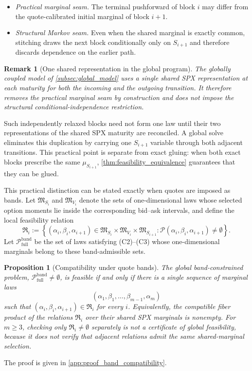 \documentclass{article}
\newtheorem{proposition}{Proposition}[section]
\newtheorem{remark}[theorem]{Remark}
\newcommand{\cP}{\mathcal{P}}
\begin{document}
\begin{itemize}
    \item \emph{Practical marginal seam.} The terminal pushforward of block $i$ may differ from the quote-calibrated initial marginal of block $i+1$.
    \item \emph{Structural Markov seam.} Even when the shared marginal is exactly common, stitching draws the next block conditionally only on $S_{i+1}$ and therefore discards dependence on the earlier path.
\end{itemize}

\begin{remark}[One shared representation in the global program]
\label{rem:seam_global}
The globally coupled model of \cref{subsec:global_model} uses a single shared SPX representation at each maturity for both the incoming and the outgoing transition.
It therefore removes the practical marginal seam by construction and does not impose the structural conditional-independence restriction.
\end{remark}

Such independently relaxed blocks need not form one law until their two representations of the shared SPX maturity are reconciled.
A global solve eliminates this duplication by carrying one $S_{i+1}$ variable through both adjacent transitions.
This practical point is separate from exact gluing: when both exact blocks prescribe the same $\mu_{S_{i+1}}$, \cref{thm:feasibility_equivalence} guarantees that they can be glued.

This practical distinction can be stated exactly when quotes are imposed as bands.
Let $\mathfrak M_{S_i}$ and $\mathfrak M_{V_i}$ denote the sets of one-dimensional laws whose selected option moments lie inside the corresponding bid--ask intervals, and define the local feasibility relation
\begin{equation}\label{eq:local_feasibility_relation}
\mathfrak R_i
:=
\left\{(\alpha_i,\beta_i,\alpha_{i+1})
\in\mathfrak M_{S_i}\times\mathfrak M_{V_i}\times\mathfrak M_{S_{i+1}}:
\cP(\alpha_i,\beta_i,\alpha_{i+1})\neq\emptyset\right\}.
\end{equation}
Let $\cP_{\mathrm{full}}^{\mathrm{band}}$ be the set of laws satisfying (C2)--(C3) whose one-dimensional marginals belong to these band-admissible sets.

\begin{proposition}[Compatibility under quote bands]\label{prop:band_compatibility}
The global band-constrained problem, $\cP_{\mathrm{full}}^{\mathrm{band}}\neq\emptyset$, is feasible if and only if there is a \emph{single} sequence of marginal laws
\[
(\alpha_1,\beta_1,\ldots,\beta_{m-1},\alpha_m)
\]
such that $(\alpha_i,\beta_i,\alpha_{i+1})\in\mathfrak R_i$ for every $i$.
Equivalently, the compatible fiber product of the relations $\mathfrak R_i$ over their shared SPX marginals is nonempty.
For $m\geq3$, checking only $\mathfrak R_i\neq\emptyset$ separately is not a certificate of global feasibility, because it does not verify that adjacent relations admit the same shared-marginal selection.
\end{proposition}
The proof is given in \cref{app:proof_band_compatibility}.
\end{document}
